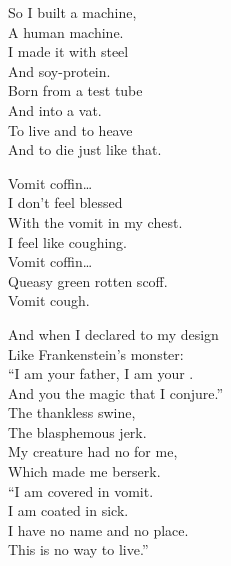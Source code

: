 



So I built a machine, \\
A human machine. \\
I made it with steel \\
And soy-protein. \\

Born from a test tube \\
And into a vat. \\
To live and to heave \\
And to die just like that. \\





Vomit coffin… \\

I don't feel blessed \\
With the vomit in my chest. \\
I feel like coughing. \\

Vomit coffin… \\

Queasy green rotten scoff. \\
Vomit cough. \\


And when I declared to my design \\
Like Frankenstein's monster: \\
``I am your father, I am your . \\
And you the magic that I conjure.'' \\

The thankless swine, \\
The blasphemous jerk. \\
My creature had no  for me, \\
Which made me berserk. \\

``I am covered in vomit. \\
I am coated in sick. \\
I have no name and no place. \\
This is no way to live.'' \\

